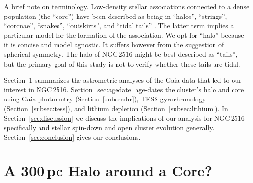 \documentclass[12pt,twocolumn,tighten]{aastex63}
\begin{document}
A brief note on terminology.  Low-density stellar associations
connected to a dense population (the ``core'') have been described as
being in ``halos'', ``strings'', ``coronae'', ``snakes'',
``outskirts'', and ``tidal tails'' \citep[{\it
e.g.},][]{davenport_death_2010,kounkel_untangling_2019,roser_hyades_2019,tian_discovery_2020,meingast_2021}.
The latter term implies a particular model for the formation of the
association.  We opt for ``halo'' because it is concise and model
agnostic.  It suffers however from the suggestion of spherical
symmetry.  The halo of NGC\,2516 might be best-described as ``tails'',
but the primary goal of this study is
not to verify whether these tails are tidal.

Section~\ref{sec:gaia} summarizes the astrometric analyses of the Gaia
data that led to our interest in NGC\,2516.  Section~\ref{sec:agedate}
age-dates the cluster's halo and core using Gaia photometry
(Section~\ref{subsec:hr}), TESS gyrochronology
(Section~\ref{subsec:tess}), and lithium depletion
(Section~\ref{subsec:lithium}).  In Section~\ref{sec:discussion} we
discuss the implications of our analysis for NGC\,2516 specifically
and stellar spin-down and open cluster evolution generally.
Section~\ref{sec:conclusion} gives our conclusions.


\section{A 300\,pc Halo around a Core?}
\label{sec:gaia}

\end{document}
